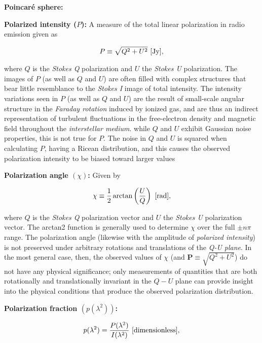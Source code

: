 \documentclass[a4paper,10pt]{article}
\begin{document}
{\noindent}\textbf{Poincar\'e sphere:}

{\noindent}\textbf{Polarized intensity ($P$):} A measure of the total linear polarization in radio emission given as

\begin{align*}
    P\equiv\sqrt{Q^2+U^2} ~ [{\rm Jy}],
\end{align*}

{\noindent}where $Q$ is the \textit{Stokes Q} polarization and $U$ the \textit{Stokes U} polarization. The images of $P$ (as well as $Q$ and $U$) are often filled with complex structures that bear little resemblance to the \textit{Stokes I} image of total intensity. The intensity variations seen in $P$ (as well as $Q$ and $U$) are the result of small-scale angular structure in the \textit{Faraday rotation} induced by ionized gas, and are thus an indirect representation of turbulent fluctuations in the free-electron density and magnetic field throughout the \textit{interstellar medium}. while $Q$ and $U$ exhibit Gaussian noise properties, this is not true for $P$. The noise in $Q$ and $U$ is squared when calculating $P$, having a Ricean distribution, and this causes the observed polarization intensity to be biased toward larger values

{\noindent}\textbf{Polarization angle $(\chi)$:} Given by

\begin{align*}
    \chi\equiv\frac{1}{2}\arctan\left(\frac{U}{Q}\right) ~ [{\rm rad}],
\end{align*}

{\noindent}where $Q$ is the \textit{Stokes Q} polarization vector and $U$ the \textit{Stokes U} polarization vector. The arctan2 function is generally used to determine $\chi$ over the full $\pm n\pi$ range. The polarization angle (likewise with the amplitude of \textit{polarized intensity}) is not preserved under arbitrary rotations and translations of the \textit{Q-U plane}. In the most general case, then, the observed values of $\chi$ (and $\mathbf{P}\equiv\sqrt{Q^2+U^2}$) do not have any physical significance; only measurements of quantities that are both rotationally and translationally invariant in the $Q-U$ plane can provide insight into the physical conditions that produce the observed polarization distribution.

{\noindent}\textbf{Polarization fraction $(p(\lambda^2))$:}

\begin{align*}
    p(\lambda^2) = \frac{P(\lambda^2)}{I(\lambda^2)} ~ [{\rm dimensionless}],
\end{align*}
\end{document}
